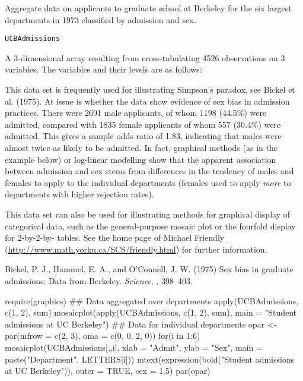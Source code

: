 %
\begin{Description}\relax
Aggregate data on applicants to graduate school at Berkeley for the
six largest departments in 1973 classified by admission and sex.
\end{Description}
%
\begin{Usage}
\begin{verbatim}
UCBAdmissions
\end{verbatim}
\end{Usage}
%
\begin{Format}
A 3-dimensional array resulting from cross-tabulating 4526
observations on 3 variables.  The variables and their levels are as
follows:


\end{Format}
%
\begin{Details}\relax
This data set is frequently used for illustrating Simpson's paradox,
see Bickel et al.\bsl{} (1975).  At issue is whether the data show evidence
of sex bias in admission practices.  There were 2691 male applicants,
of whom 1198 (44.5\%) were admitted, compared with 1835 female
applicants of whom 557 (30.4\%) were admitted.  This gives a sample
odds ratio of 1.83, indicating that males were almost twice as likely
to be admitted.  In fact, graphical methods (as in the example below)
or log-linear modelling show that the apparent association between
admission and sex stems from differences in the tendency of males and
females to apply to the individual departments (females used to apply
\emph{more} to departments with higher rejection rates).

This data set can also be used for illustrating methods for graphical
display of categorical data, such as the general-purpose mosaic plot
or the fourfold display for 2-by-2-by- tables.  See the
home page of Michael Friendly
(\url{http://www.math.yorku.ca/SCS/friendly.html}) for further
information.
\end{Details}
%
\begin{References}\relax
Bickel, P. J., Hammel, E. A., and O'Connell, J. W. (1975)
Sex bias in graduate admissions: Data from Berkeley.
\emph{Science}, , 398--403.
\end{References}
%
\begin{Examples}
\begin{ExampleCode}
require(graphics)
## Data aggregated over departments
apply(UCBAdmissions, c(1, 2), sum)
mosaicplot(apply(UCBAdmissions, c(1, 2), sum),
           main = "Student admissions at UC Berkeley")
## Data for individual departments
opar <- par(mfrow = c(2, 3), oma = c(0, 0, 2, 0))
for(i in 1:6)
  mosaicplot(UCBAdmissions[,,i],
    xlab = "Admit", ylab = "Sex",
    main = paste("Department", LETTERS[i]))
mtext(expression(bold("Student admissions at UC Berkeley")),
      outer = TRUE, cex = 1.5)
par(opar)
\end{ExampleCode}
\end{Examples}
